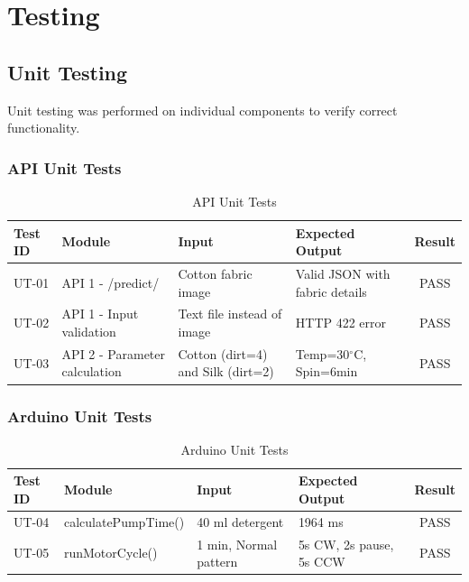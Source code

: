 \chapter{Testing}

\section{Unit Testing}
Unit testing was performed on individual components to verify correct functionality.

\subsection{API Unit Tests}
\begin{table}[H]
    \centering
    \small
    \begin{tabularx}{\textwidth}{|l|X|X|X|c|}
        \hline
        \textbf{Test ID} & \textbf{Module} & \textbf{Input} & \textbf{Expected Output} & \textbf{Result} \\
        \hline
        UT-01 & API 1 - /predict/ & Cotton fabric image & Valid JSON with fabric details & PASS \\
        \hline
        UT-02 & API 1 - Input validation & Text file instead of image & HTTP 422 error & PASS \\
        \hline
        UT-03 & API 2 - Parameter calculation & Cotton (dirt=4) and Silk (dirt=2) & Temp=30$^\circ$C, Spin=6min & PASS \\
        \hline
    \end{tabularx}
    \caption{API Unit Tests}
    \label{tab:unit_api}
\end{table}

\subsection{Arduino Unit Tests}
\begin{table}[H]
    \centering
    \small
    \begin{tabularx}{\textwidth}{|l|l|X|X|c|}
        \hline
        \textbf{Test ID} & \textbf{Module} & \textbf{Input} & \textbf{Expected Output} & \textbf{Result} \\
        \hline
        UT-04 & calculatePumpTime() & 40 ml detergent & 1964 ms & PASS \\
        \hline
        UT-05 & runMotorCycle() & 1 min, Normal pattern & 5s CW, 2s pause, 5s CCW & PASS \\
        \hline
    \end{tabularx}
    \caption{Arduino Unit Tests}
    \label{tab:unit_arduino}
\end{table}

